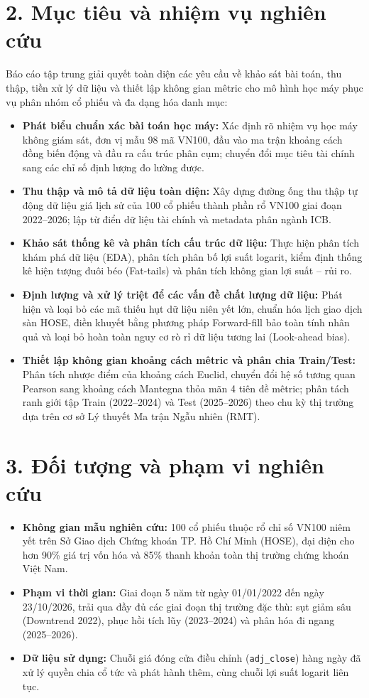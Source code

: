 \documentclass[12pt,a4paper,oneside,openany]{report}
\begin{document}
\section*{2. Mục tiêu và nhiệm vụ nghiên cứu}
Báo cáo tập trung giải quyết toàn diện các yêu cầu về khảo sát bài toán, thu thập, tiền xử lý dữ liệu và thiết lập không gian mêtric cho mô hình học máy phục vụ phân nhóm cổ phiếu và đa dạng hóa danh mục:
\begin{itemize}
  \item \textbf{Phát biểu chuẩn xác bài toán học máy:} Xác định rõ nhiệm vụ học máy không giám sát, đơn vị mẫu 98 mã VN100, đầu vào ma trận khoảng cách đồng biến động và đầu ra cấu trúc phân cụm; chuyển đổi mục tiêu tài chính sang các chỉ số định lượng đo lường được.
  \item \textbf{Thu thập và mô tả dữ liệu toàn diện:} Xây dựng đường ống thu thập tự động dữ liệu giá lịch sử của 100 cổ phiếu thành phần rổ VN100 giai đoạn 2022--2026; lập từ điển dữ liệu tài chính và metadata phân ngành ICB.
  \item \textbf{Khảo sát thống kê và phân tích cấu trúc dữ liệu:} Thực hiện phân tích khám phá dữ liệu (EDA), phân tích phân bố lợi suất logarit, kiểm định thống kê hiện tượng đuôi béo (Fat-tails) và phân tích không gian lợi suất -- rủi ro.
  \item \textbf{Định lượng và xử lý triệt để các vấn đề chất lượng dữ liệu:} Phát hiện và loại bỏ các mã thiếu hụt dữ liệu niên yết lớn, chuẩn hóa lịch giao dịch sàn HOSE, điền khuyết bằng phương pháp Forward-fill bảo toàn tính nhân quả và loại bỏ hoàn toàn nguy cơ rò rỉ dữ liệu tương lai (Look-ahead bias).
  \item \textbf{Thiết lập không gian khoảng cách mêtric và phân chia Train/Test:} Phân tích nhược điểm của khoảng cách Euclid, chuyển đổi hệ số tương quan Pearson sang khoảng cách Mantegna thỏa mãn 4 tiên đề mêtric; phân tách ranh giới tập Train (2022--2024) và Test (2025--2026) theo chu kỳ thị trường dựa trên cơ sở Lý thuyết Ma trận Ngẫu nhiên (RMT).
\end{itemize}

\section*{3. Đối tượng và phạm vi nghiên cứu}
\begin{itemize}
  \item \textbf{Không gian mẫu nghiên cứu:} 100 cổ phiếu thuộc rổ chỉ số VN100 niêm yết trên Sở Giao dịch Chứng khoán TP. Hồ Chí Minh (HOSE), đại diện cho hơn 90\% giá trị vốn hóa và 85\% thanh khoản toàn thị trường chứng khoán Việt Nam.
  \item \textbf{Phạm vi thời gian:} Giai đoạn 5 năm từ ngày 01/01/2022 đến ngày 23/10/2026, trải qua đầy đủ các giai đoạn thị trường đặc thù: sụt giảm sâu (Downtrend 2022), phục hồi tích lũy (2023--2024) và phân hóa đi ngang (2025--2026).
  \item \textbf{Dữ liệu sử dụng:} Chuỗi giá đóng cửa điều chỉnh (\texttt{adj\_close}) hàng ngày đã xử lý quyền chia cổ tức và phát hành thêm, cùng chuỗi lợi suất logarit liên tục.
\end{itemize}
\end{document}

